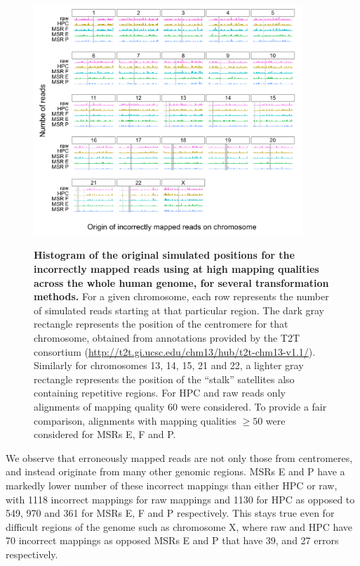 \documentclass[
  11pt,
  twoside,
  BCOR=10mm,
  listof=totoc]{scrbook}
\newcommand{\extcaption}[2]{
    \caption[#1]{
        \textbf{#1}\newline
        #2
    }
}
\begin{document}
\begin{figure}[H]
    \centering
    \includegraphics[width=0.9\textwidth]{figures/HPC-MSRs/ridgelines.new_selection.pdf}\\
    \extcaption{Histogram of the original simulated positions for the incorrectly mapped reads using \minimap at high mapping qualities across the whole human genome, for several transformation methods.}{For a given chromosome, each row represents the number of simulated reads starting at that particular region. The dark gray rectangle represents the position of the centromere for that chromosome, obtained from annotations provided by the T2T consortium (\href{http://t2t.gi.ucsc.edu/chm13/hub/t2t-chm13-v1.1/}{http://t2t.gi.ucsc.edu/chm13/hub/t2t-chm13-v1.1/}). Similarly for chromosomes 13, 14, 15, 21 and 22, a lighter gray rectangle represents the position of the ``stalk'' satellites also containing repetitive regions. For HPC and raw reads only alignments of mapping quality 60 were considered. To provide a fair comparison, alignments with mapping qualities $\geq 50$ were considered for MSRs E, F and P.}
    \label{fig:errorHists}
\end{figure}

We observe that erroneously mapped reads are not only those from centromeres, and instead originate from many other genomic regions. MSRs E and P have a markedly lower number of these incorrect mappings than either HPC or raw, with 1118 incorrect mappings for raw mappings and 1130 for HPC as opposed to 549, 970 and 361 for MSRs E, F and P respectively. This stays true even for difficult regions of the genome such as chromosome X, where raw and HPC have 70 incorrect mappings as opposed MSRs E and P that have 39, and 27 errors respectively.
\end{document}
